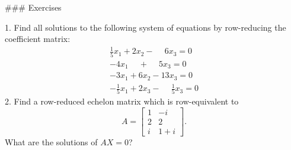 ### Exercises

1. Find all solutions to the following system of equations by row-reducing the coefficient matrix: \[\begin{array}{l}\frac{1}{5}x_{1}+2x_{2}-\phantom{-}6x_{3}=0\\ -4x_{1}\phantom{-}+\phantom{-}5x_{3}=0\\ -3x_{1}+6x_{2}-13x_{3}=0\\ -\frac{1}{5}x_{1}+2x_{3}-\phantom{-}\frac{1}{5}x_{3}=0\end{array}\]
2. Find a row-reduced echelon matrix which is row-equivalent to \[A=\begin{bmatrix}1&-i\\ 2&2\\ i&1+i\end{bmatrix}.\] What are the solutions of \(AX=0\)? 